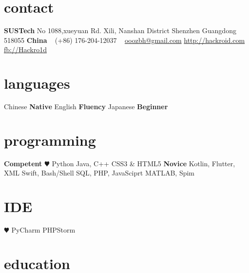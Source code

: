 \documentclass[]{friggeri-cv-a4}
\begin{document}


\begin{aside} %
\section{contact}
\textbf{SUSTech}
No 1088,xueyuan Rd.
Xili, Nanshan District
Shenzhen
Guangdong
518055
\textbf{China}
~
(+86) 176-204-12037
~
\href{mailto:ooozbh@gmail.com}{ooozbh@gmail.com}
\href{http://hackroid.com}{http://hackroid.com}
\href{http://www.facebook.com/Hackro1d}{fb://Hackro1d}
\section{languages}
Chinese \textbf{Native}
English \textbf{Fluency}
Japanese \textbf{Beginner}
\section{programming}
\textbf{Competent}
{\color{red} $\varheart$} Python
Java, C++
CSS3 \& HTML5
\textbf{Novice}
Kotlin, Flutter, XML
Swift, Bash/Shell
SQL, PHP, JavaSciprt
MATLAB, Spim
\section{IDE}
{\color{red} $\varheart$} PyCharm
PHPStorm
\end{aside}


\section{education}
\end{document}
